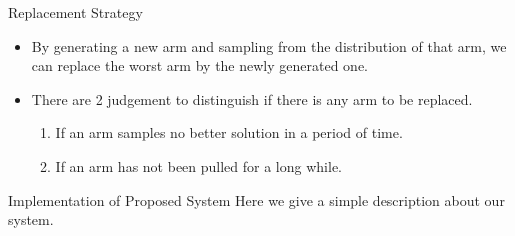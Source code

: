 \begin{frame}{Replacement Strategy} 
\begin{itemize} 
  \item By generating a new arm and sampling from the distribution of
          that arm, we can replace the worst arm by the newly generated
          one.  
          \vspace*{14pt}
    \item There are 2 judgement to distinguish if there is any arm to
      be replaced.
      \begin{enumerate}
        \item If an arm samples no better solution in a period of time.
        \item If an arm has not been pulled for a long while.
      \end{enumerate}
  \end{itemize}
\end{frame}
\begin{frame}{Implementation of Proposed System}
  Here we give a simple description about our system.
  \vspace*{8pt}
\end{frame}





